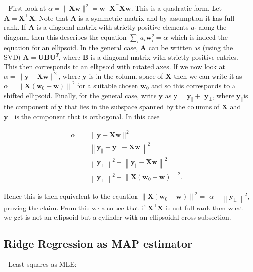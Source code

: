 - First look at $\alpha=\|\mathbf{X w}\|^{2}=\mathbf{w}^{\top} \mathbf{X}^{\top} \mathbf{X w}$. This is a quadratic form. Let $\mathbf{A}=\mathbf{X}^{\top} \mathbf{X}$. Note that $\mathbf{A}$ is a symmetric matrix and by assumption it has full rank. If $\mathbf{A}$ is a diagonal matrix with strictly positive elements $a_{i}$ along the diagonal then this describes the equation 
$
\sum_{i} a_{i} \mathbf{w}_{i}^{2}=\alpha
$ 
which is indeed the equation for an ellipsoid. In the general case, $\mathbf{A}$ can be written as (using the SVD) $\mathbf{A}=\mathbf{U B U}^{T}$, where $\mathbf{B}$ is a diagonal matrix with strictly positive entries. This then corresponds to an ellipsoid with rotated axes. If we now look at $\alpha=\|\mathbf{y}-\mathbf{X} \mathbf{w}\|^{2}$, where $\mathbf{y}$ is in the column space of $\mathbf{X}$ then we can write it as $\alpha=\left\|\mathbf{X}\left(\mathbf{w}_{0}-\mathbf{w}\right)\right\|^{2}$ for a suitable chosen $\mathbf{w}_{0}$ and so this corresponds to a shifted ellipsoid. Finally, for the general case, write $\mathbf{y}$ as $\mathbf{y}=\mathbf{y}_{\|}+$ $\mathbf{y}_{\perp}$, where $\mathbf{y}_{\|}$is the component of $\mathbf{y}$ that lies in the subspace spanned by the columns of $\mathbf{X}$ and $\mathbf{y}_{\perp}$ is the component that
is orthogonal. In this case

$$
\begin{aligned}
\alpha & =\|\mathbf{y}-\mathbf{X} \mathbf{w}\|^{2} \\
& =\left\|\mathbf{y}_{\|}+\mathbf{y}_{\perp}-\mathbf{X} \mathbf{w}\right\|^{2} \\
& =\left\|\mathbf{y}_{\perp}\right\|^{2}+\left\|\mathbf{y}_{\|}-\mathbf{X} \mathbf{w}\right\|^{2} \\
& =\left\|\mathbf{y}_{\perp}\right\|^{2}+\left\|\mathbf{X}\left(\mathbf{w}_{0}-\mathbf{w}\right)\right\|^{2} .
\end{aligned}
$$

Hence this is then equivalent to the equation $\left\|\mathbf{X}\left(\mathbf{w}_{0}-\mathbf{w}\right)\right\|^{2}=$ $\alpha-\left\|\mathbf{y}_{\perp}\right\|^{2}$, proving the claim. From this we also see that if $\mathbf{X}^{\top} \mathbf{X}$ is not full rank then what we get is not an ellipsoid but a cylinder with an ellipsoidal cross-subsection.


\subsection*{Ridge Regression as MAP estimator}
- Least squares as MLE:

